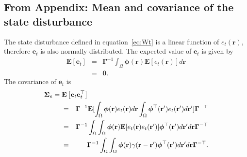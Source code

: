 \documentclass[10pt]{article}
\begin{document}
\subsection{From Appendix: Mean and covariance of the state disturbance }\label{ColoredNoise} 
The state disturbance defined in equation~\ref{eq:Wt} is a linear function of $e_t(\mathbf r)$, therefore $\mathbf{e}_t$ is also normally distributed. The expected value of $\mathbf e_t$ is given by 
\begin{eqnarray}
	\mathbf E\left[ \mathbf e_t\right]&=& \mathbf{\Gamma}^{-1}\int_{\Omega}\boldsymbol\phi\left(\mathbf{r}\right)\mathbf E\left[e_t\left(\mathbf{r}\right)\right] d\mathbf{r} \nonumber \\
	&=&\mathbf 0.
\end{eqnarray}
The covariance of $\mathbf{e}_t$ is 
\begin{eqnarray}
	\boldsymbol\Sigma_e =\lefteqn{\mathbf E\left[ \mathbf e_t\mathbf e_t^\top\right]} \nonumber \\ 
&=&\mathbf{\Gamma}^{-1}\mathbf E[\int_{\Omega}\boldsymbol{\phi}(\mathbf{r})e_t(\mathbf{r})d\mathbf{r} \int_{\Omega}\boldsymbol{\phi}^{\top}(\mathbf{r}') e_t(\mathbf{r}')d\mathbf{r}']\mathbf{\Gamma}^{- \top} \nonumber \\
	&=&\mathbf{\Gamma}^{-1}\int_{\Omega}\int_{\Omega} \boldsymbol{\phi}(\mathbf{r}) \mathbf E[e_t(\mathbf{r})e_t(\mathbf{r}')]\boldsymbol{\phi}^{\top}(\mathbf{r}')d\mathbf{r}' d\mathbf r\mathbf{\Gamma}^{- \top} \nonumber\\
	&=&\mathbf{\Gamma}^{-1}\int_{\Omega}\int_{\Omega}\boldsymbol{\phi}(\mathbf r) \gamma(\mathbf r- \mathbf r' )\boldsymbol{\phi}^{\top}(\mathbf r')d\mathbf r' d\mathbf r\mathbf{\Gamma}^{-\top}.
\end{eqnarray}
\end{document}
